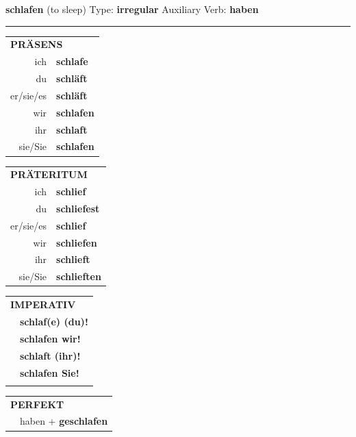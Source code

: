 \documentclass[10pt,a4paper]{revtex4-2}
\begin{document}
\begin{verbbox}
    {\Large \bf schlafen} (to sleep) \hfill Type: \textbf{irregular} \hfill Auxiliary Verb: \textbf{haben} 
    
     \vspace{5pt}

    \hrule
    
    \vspace{5pt}

  \begin{tabular}{rl}
     \multicolumn{2}{l}{\textbf{PRÄSENS} }\\
    ich & \textbf{schlafe}\\
    du & \textbf{schläft}\\
    er/sie/es & \textbf{schläft}\\
    wir & \textbf{schlafen}\\
    ihr & \textbf{schlaft}\\
    sie/Sie & \textbf{schlafen}\\
  \end{tabular}
  \hfill
     \begin{tabular}{rl}
    \multicolumn{2}{l}{\textbf{PRÄTERITUM} }\\
    ich & \textbf{schlief}\\
    du & \textbf{schliefest}\\
    er/sie/es & \textbf{schlief}\\
    wir & \textbf{schliefen}\\
    ihr & \textbf{schlieft}\\
    sie/Sie & \textbf{schlieften}\\
  \end{tabular}
  \hfill
  \begin{tabular}{rl}
     \multicolumn{2}{l}{\textbf{IMPERATIV} }\\
   & \textbf{schlaf(e) (du)!}\\
   & \textbf{schlafen wir!}\\
   & \textbf{schlaft (ihr)!}\\
   & \textbf{schlafen Sie!}\\
   & \vspace{10pt}
  \end{tabular}

    \vspace{10pt}

 \begin{tabular}{rl}
     \multicolumn{2}{l}{\textbf{PERFEKT}}\\
  &  haben + \textbf{geschlafen}\\
  \end{tabular}
\hfill
   \begin{tabular}{rl}
   

\end{tabular}
\end{verbbox}
\end{document}
